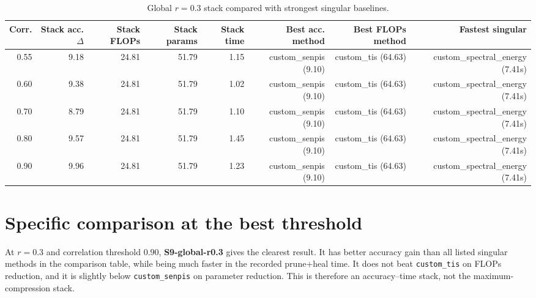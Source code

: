 \documentclass[11pt]{article}
\newcommand{\stackname}[1]{\textbf{#1}}
\begin{document}
\begin{table}[H]\centering\caption{Global $r=0.3$ stack compared with strongest singular baselines.}\label{tab:global03}\begin{tabular}{rrrrrrrr}\toprule Corr. & Stack acc. $\Delta$ & Stack FLOPs & Stack params & Stack time & Best acc. method & Best FLOPs method & Fastest singular \\ \midrule
0.55 & 9.18 & 24.81 & 51.79 & 1.15 & custom\_senpis (9.10) & custom\_tis (64.63) & custom\_spectral\_energy (7.41s) \\
0.60 & 9.38 & 24.81 & 51.79 & 1.02 & custom\_senpis (9.10) & custom\_tis (64.63) & custom\_spectral\_energy (7.41s) \\
0.70 & 8.79 & 24.81 & 51.79 & 1.10 & custom\_senpis (9.10) & custom\_tis (64.63) & custom\_spectral\_energy (7.41s) \\
0.80 & 9.57 & 24.81 & 51.79 & 1.45 & custom\_senpis (9.10) & custom\_tis (64.63) & custom\_spectral\_energy (7.41s) \\
0.90 & 9.96 & 24.81 & 51.79 & 1.23 & custom\_senpis (9.10) & custom\_tis (64.63) & custom\_spectral\_energy (7.41s) \\
\bottomrule\end{tabular}\end{table}

\section*{Specific comparison at the best threshold}
At $r=0.3$ and correlation threshold $0.90$, \stackname{S9-global-r0.3} gives the clearest result.  It has better accuracy gain than all listed singular methods in the comparison table, while being much faster in the recorded prune+heal time.  It does not beat \texttt{custom\_tis} on FLOPs reduction, and it is slightly below \texttt{custom\_senpis} on parameter reduction.  This is therefore an accuracy--time stack, not the maximum-compression stack.
\end{document}

